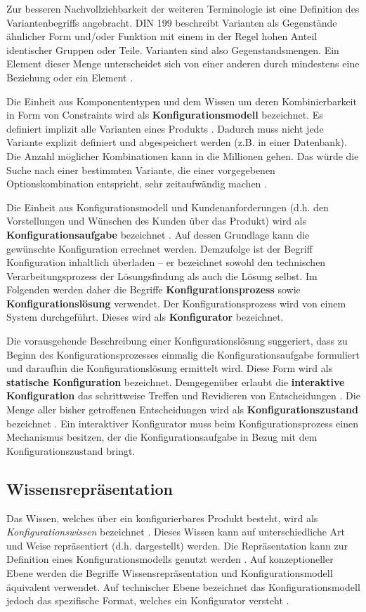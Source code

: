 \documentclass[11pt, a4paper, titlepage, listof=totoc, bibliography=totoc, index=totoc, twoside, openright, headings=normal]{scrreprt}
\begin{document}
Zur besseren Nachvollziehbarkeit der weiteren Terminologie ist eine Definition des Variantenbegriffs angebracht. DIN 199 beschreibt Varianten als \glqq Gegenstände ähnlicher Form und/oder Funktion mit einem in der Regel hohen Anteil identischer Gruppen oder Teile\grqq{}. Varianten sind also Gegenstandsmengen. Ein Element dieser Menge unterscheidet sich von einer anderen durch mindestens eine Beziehung oder ein Element \citep{lutz11}.

Die Einheit aus Komponententypen und dem Wissen um deren Kombinierbarkeit in Form von Constraints wird als \textbf{Konfigurationsmodell} bezeichnet. Es definiert implizit alle Varianten eines Produkts \citep{soininen98}. Dadurch muss nicht jede Variante explizit definiert und abgespeichert werden (z.B. in einer Datenbank). Die Anzahl möglicher Kombinationen kann in die Millionen gehen. Das würde die Suche nach einer bestimmten Variante, die einer vorgegebenen Optionskombination entspricht, sehr zeitaufwändig machen \citep{falkner11}.

Die Einheit aus Konfigurationsmodell und Kundenanforderungen (d.h. den Vorstellungen und Wünschen des Kunden über das Produkt) wird als \textbf{Konfigurationsaufgabe} bezeichnet \citep{felferning14}. Auf dessen Grundlage kann die gewünschte Konfiguration errechnet werden. Demzufolge ist der Begriff Konfiguration inhaltlich überladen -- er bezeichnet sowohl den technischen Verarbeitungsprozess der Lösungsfindung als auch die Lösung selbst. Im Folgenden werden daher die Begriffe \textbf{Konfigurationsprozess} sowie \textbf{Konfigurationslösung} verwendet. Der Konfigurationsprozess wird von einem System durchgeführt. Dieses wird als \textbf{Konfigurator} bezeichnet.

Die vorausgehende Beschreibung einer Konfigurationslösung suggeriert, dass zu Beginn des Konfigurationsprozesses einmalig die Konfigurationsaufgabe formuliert und daraufhin die Konfigurationslösung ermittelt wird. Diese Form wird als \textbf{statische Konfiguration} bezeichnet. Demgegenüber erlaubt die \textbf{interaktive Konfiguration} das schrittweise Treffen und Revidieren von Entscheidungen \citep{hadzic04}. Die Menge aller bisher getroffenen Entscheidungen wird als \textbf{Konfigurationszustand} bezeichnet \citep{tactonTCsiteDevelopmentManual}. Ein interaktiver Konfigurator muss beim Konfigurationsprozess einen Mechanismus besitzen, der die Konfigurationsaufgabe in Bezug mit dem Konfigurationszustand bringt.

\subsection{Wissensrepräsentation}
\label{wissenrepraesentation}
Das Wissen, welches über ein konfigurierbares Produkt besteht, wird als  \emph{Konfigurationswissen} bezeichnet \citep{soininen98}. Dieses Wissen kann auf unterschiedliche Art und Weise repräsentiert (d.h. dargestellt) werden. Die Repräsentation kann zur Definition eines Konfigurationsmodells genutzt werden \citep{felferning14}. Auf konzeptioneller Ebene werden die Begriffe Wissensrepräsentation und Konfigurationsmodell äquivalent verwendet. Auf technischer Ebene bezeichnet das Konfigurationsmodell jedoch das spezifische Format, welches ein Konfigurator versteht \citep{soininen98}.
\end{document}
